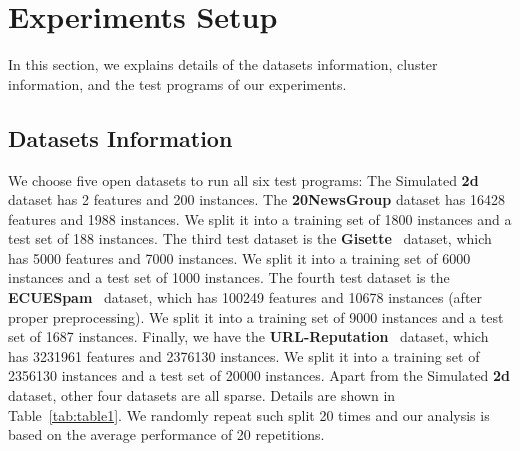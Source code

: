 \documentclass{llncs}
\begin{document}
\section{Experiments Setup} \label{sec:setup}
In this section, we explains details of the datasets information, cluster information, and the test programs of our experiments.

\subsection{Datasets Information}
We choose five open datasets to run all six test programs:	
The	Simulated \textbf{2d} dataset has 2 features and 200 instances.
The	\textbf{20NewsGroup} dataset has 16428 features and 1988 instances. We split it into a training set of 1800 instances and a test set of 188 instances.	
The	third test dataset is the \textbf{Gisette}~\cite{guyon2004result} dataset, which has 5000 features and 7000 instances. We split it into a training set of 6000 instances and a test set of 1000 instances.
The	fourth test dataset is the \textbf{ECUESpam}~\cite{DelanyKBS05} dataset, which has 100249 features and 10678 instances (after proper preprocessing). We split it into a training set of 9000 instances and a test set of 1687 instances.
Finally, we have the \textbf{URL-Reputation}~\cite{ma2009identifying} dataset, which has 3231961 features and 2376130 instances.
We split it into a training set of 2356130 instances and a test set of 20000 instances.
Apart from the Simulated \textbf{2d} dataset, other four datasets are all sparse. Details are shown in Table~\ref{tab:table1}.
We randomly repeat such split 20 times and our analysis is based on the average performance of 20 repetitions.
\end{document}
